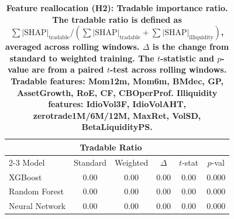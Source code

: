 \begin{table}[t!]
\centering
\begin{tabular}{l cc cc c}
\midrule
& \multicolumn{2}{c}{Tradable Ratio} & & & \\
\cmidrule(lr){2-3}
Model & Standard & Weighted & $\Delta$ & $t$-stat & $p$-val \\
\midrule
XGBoost        & 0.00 & 0.00 & 0.00 & 0.00 & 0.000 \\
Random Forest  & 0.00 & 0.00 & 0.00 & 0.00 & 0.000 \\
Neural Network & 0.00 & 0.00 & 0.00 & 0.00 & 0.000 \\
\midrule
\end{tabular}
\caption{\footnotesize \bf Feature reallocation (H2): Tradable importance ratio\normalfont. The tradable ratio is defined as $\sum |\text{SHAP}|_{\text{tradable}} / (\sum |\text{SHAP}|_{\text{tradable}} + \sum |\text{SHAP}|_{\text{illiquidity}})$, averaged across rolling windows. $\Delta$ is the change from standard to weighted training. The $t$-statistic and $p$-value are from a paired $t$-test across rolling windows. Tradable features: Mom12m, Mom6m, BMdec, GP, AssetGrowth, RoE, CF, CBOperProf. Illiquidity features: IdioVol3F, IdioVolAHT, zerotrade1M/6M/12M, MaxRet, VolSD, BetaLiquidityPS.}
\label{tab:h2_summary}
\end{table}
